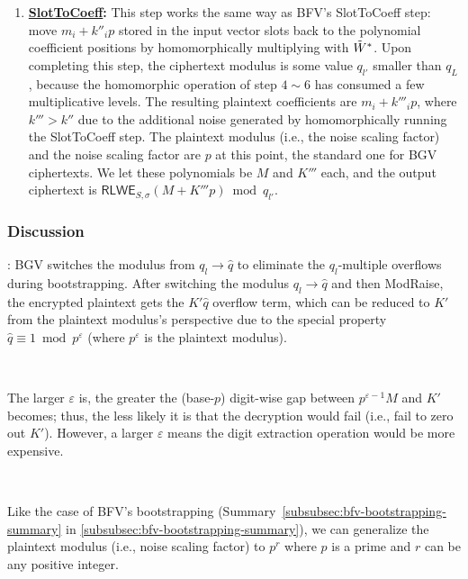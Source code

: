 \begin{enumerate}
$ $

\item \textbf{\textsf{\underline{SlotToCoeff}}:} This step works the same way as BFV's \textsf{SlotToCoeff} step: move $m_i + k''_ip$ stored in the input vector slots back to the polynomial coefficient positions by homomorphically multiplying with $\tilde W^*$. Upon completing this step, the ciphertext modulus is some value $q_{l'}$ smaller than $q_L$, because the homomorphic operation of step $4\sim6$ has consumed a few multiplicative levels. The resulting plaintext coefficients are $m_i + k'''_ip$, where $k''' > k''$ due to the additional noise generated by homomorphically running the \textsf{SlotToCoeff} step. The plaintext modulus (i.e., the noise scaling factor) and the noise scaling factor are $p$ at this point, the standard one for BGV ciphertexts. We let these polynomials be $M$ and $K'''$ each, and the output ciphertext is $\textsf{RLWE}_{S, \sigma}(M + K'''p) \bmod q_{l'}$.



\end{enumerate}



\subsubsection{Discussion} 

: BGV switches the modulus from $q_l \rightarrow \hat{q}$ to eliminate the $q_l$-multiple overflows during bootstrapping. After switching the modulus $q_l \rightarrow \hat{q}$ and then \textsf{ModRaise}, the encrypted plaintext gets the $K'\hat{q}$ overflow term, which can be reduced to $K'$ from the plaintext modulus's perspective due to the special property $\hat{q} \equiv 1 \bmod p^\varepsilon$ (where $p^\varepsilon$ is the plaintext modulus).

$ $

 The larger $\varepsilon$ is, the greater the (base-$p$) digit-wise gap between $p^{\varepsilon-1}M$ and $K'$ becomes; thus, the less likely it is that the decryption would fail (i.e., fail to zero out $K'$). However, a larger $\varepsilon$ means the digit extraction operation would be more expensive. 

$ $


 Like the case of BFV's bootstrapping (Summary~\ref*{subsubsec:bfv-bootstrapping-summary} in \autoref{subsubsec:bfv-bootstrapping-summary}), we can generalize the plaintext modulus (i.e., noise scaling factor) to $p^r$ where $p$ is a prime and $r$ can be any positive integer. 







